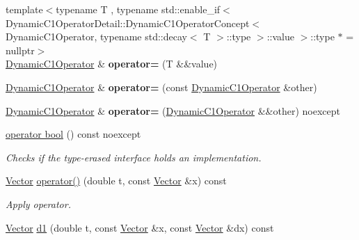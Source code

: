 \begin{DoxyCompactItemize}
\item 
\hypertarget{classSpacy_1_1DynamicC1Operator_a30da03500f47757230e26cd0eb5a684b}{{\footnotesize template$<$typename T , typename std\-::enable\-\_\-if$<$ Dynamic\-C1\-Operator\-Detail\-::\-Dynamic\-C1\-Operator\-Concept$<$ Dynamic\-C1\-Operator, typename std\-::decay$<$ T $>$\-::type $>$\-::value $>$\-::type $\ast$  = nullptr$>$ }\\\hyperlink{classSpacy_1_1DynamicC1Operator}{\-Dynamic\-C1\-Operator} \& {\bfseries operator=} (\-T \&\&value)}\label{classSpacy_1_1DynamicC1Operator_a30da03500f47757230e26cd0eb5a684b}

\item 
\hypertarget{classSpacy_1_1DynamicC1Operator_a50675c96427f1b690300310e1416eae7}{\hyperlink{classSpacy_1_1DynamicC1Operator}{\-Dynamic\-C1\-Operator} \& {\bfseries operator=} (const \hyperlink{classSpacy_1_1DynamicC1Operator}{\-Dynamic\-C1\-Operator} \&other)}\label{classSpacy_1_1DynamicC1Operator_a50675c96427f1b690300310e1416eae7}

\item 
\hypertarget{classSpacy_1_1DynamicC1Operator_a032fa2057de1dbff43936ec71a56bc20}{\hyperlink{classSpacy_1_1DynamicC1Operator}{\-Dynamic\-C1\-Operator} \& {\bfseries operator=} (\hyperlink{classSpacy_1_1DynamicC1Operator}{\-Dynamic\-C1\-Operator} \&\&other) noexcept}\label{classSpacy_1_1DynamicC1Operator_a032fa2057de1dbff43936ec71a56bc20}

\item 
\hyperlink{classSpacy_1_1DynamicC1Operator_a96e8e4291ea083b224d5e8efdab87ed7}{operator bool} () const noexcept
\begin{DoxyCompactList}\small\item\em \-Checks if the type-\/erased interface holds an implementation. \end{DoxyCompactList}\item 
\hypertarget{classSpacy_1_1DynamicC1Operator_a0859e4c204d9599769c42ca4147f1875}{\hyperlink{classSpacy_1_1Vector}{\-Vector} \hyperlink{classSpacy_1_1DynamicC1Operator_a0859e4c204d9599769c42ca4147f1875}{operator()} (double t, const \hyperlink{classSpacy_1_1Vector}{\-Vector} \&x) const }\label{classSpacy_1_1DynamicC1Operator_a0859e4c204d9599769c42ca4147f1875}

\begin{DoxyCompactList}\small\item\em \-Apply operator. \end{DoxyCompactList}\item 
\hypertarget{classSpacy_1_1DynamicC1Operator_acac514b4a574321a0bf923f9b348e106}{\hyperlink{classSpacy_1_1Vector}{\-Vector} \hyperlink{classSpacy_1_1DynamicC1Operator_acac514b4a574321a0bf923f9b348e106}{d1} (double t, const \hyperlink{classSpacy_1_1Vector}{\-Vector} \&x, const \hyperlink{classSpacy_1_1Vector}{\-Vector} \&dx) const }\label{classSpacy_1_1DynamicC1Operator_acac514b4a574321a0bf923f9b348e106}


\end{DoxyCompactItemize}
